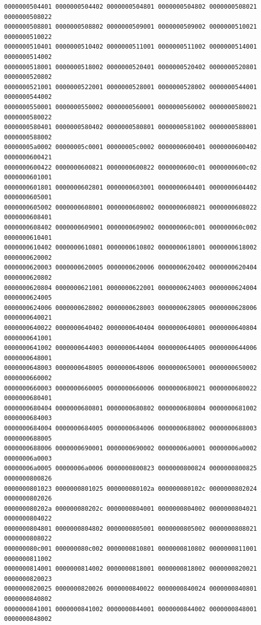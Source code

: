 \begin{Verbatim}[fontsize=\scriptsize]
0000000504401 0000000504402 0000000504801 0000000504802 0000000508021 0000000508022
0000000508801 0000000508802 0000000509001 0000000509002 0000000510021 0000000510022
0000000510401 0000000510402 0000000511001 0000000511002 0000000514001 0000000514002
0000000518001 0000000518002 0000000520401 0000000520402 0000000520801 0000000520802
0000000521001 0000000522001 0000000528001 0000000528002 0000000544001 0000000544002
0000000550001 0000000550002 0000000560001 0000000560002 0000000580021 0000000580022
0000000580401 0000000580402 0000000580801 0000000581002 0000000588001 0000000588002
00000005a0002 00000005c0001 00000005c0002 0000000600401 0000000600402 0000000600421
0000000600422 0000000600821 0000000600822 0000000600c01 0000000600c02 0000000601001
0000000601801 0000000602801 0000000603001 0000000604401 0000000604402 0000000605001
0000000605002 0000000608001 0000000608002 0000000608021 0000000608022 0000000608401
0000000608402 0000000609001 0000000609002 000000060c001 000000060c002 0000000610401
0000000610402 0000000610801 0000000610802 0000000618001 0000000618002 0000000620002
0000000620003 0000000620005 0000000620006 0000000620402 0000000620404 0000000620802
0000000620804 0000000621001 0000000622001 0000000624003 0000000624004 0000000624005
0000000624006 0000000628002 0000000628003 0000000628005 0000000628006 0000000640021
0000000640022 0000000640402 0000000640404 0000000640801 0000000640804 0000000641001
0000000641002 0000000644003 0000000644004 0000000644005 0000000644006 0000000648001
0000000648003 0000000648005 0000000648006 0000000650001 0000000650002 0000000660002
0000000660003 0000000660005 0000000660006 0000000680021 0000000680022 0000000680401
0000000680404 0000000680801 0000000680802 0000000680804 0000000681002 0000000684003
0000000684004 0000000684005 0000000684006 0000000688002 0000000688003 0000000688005
0000000688006 0000000690001 0000000690002 00000006a0001 00000006a0002 00000006a0003
00000006a0005 00000006a0006 0000000800823 0000000800824 0000000800825 0000000800826
0000000801023 0000000801025 000000080102a 000000080102c 0000000802024 0000000802026
000000080202a 000000080202c 0000000804001 0000000804002 0000000804021 0000000804022
0000000804801 0000000804802 0000000805001 0000000805002 0000000808021 0000000808022
000000080c001 000000080c002 0000000810801 0000000810802 0000000811001 0000000811002
0000000814001 0000000814002 0000000818001 0000000818002 0000000820021 0000000820023
0000000820025 0000000820026 0000000840022 0000000840024 0000000840801 0000000840802
0000000841001 0000000841002 0000000844001 0000000844002 0000000848001 0000000848002

\end{Verbatim}
